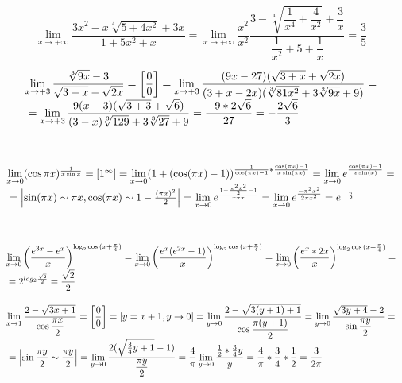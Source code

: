 \documentclass[12pt]{article}
\begin{document}
$$
\begin{array}{l}
\lim\limits_{x\rightarrow+\infty} \dfrac{3x^2-x\sqrt[4]{5+4x^2}+3x}{1+5x^2+x}=\lim\limits_{x\rightarrow+\infty} \dfrac{x^2}{x^2}\dfrac{3-\sqrt[4]{\dfrac{1}{x^4}+\dfrac{4}{x^2}}+\dfrac{3}{x}}{\dfrac{1}{x^2}+5+\dfrac{1}{x}}=\dfrac{3}{5}
\end{array}
$$
 $$
 \begin{array}{l} 
 \lim\limits_{x\rightarrow+3} \dfrac{\sqrt[3]{9x}-3}{\sqrt{3+x}-\sqrt{2x}} = \left[\dfrac{0}{0} \right]= \lim\limits_{x\rightarrow+3} \dfrac{(9x-27)(\sqrt{3+x}+\sqrt{2x})}{(3+x-2x)(\sqrt[3]{81x^2}+3\sqrt[3]{9x}+9)}=\\ \medskip{}{} = \lim\limits_{x\rightarrow+3} \dfrac{9(x-3)(\sqrt{3+3}+\sqrt{6})}{(3-x)\sqrt[3]{129}+3\sqrt[3]{27}+9}=\dfrac{-9*2\sqrt{6}}{27}=-\dfrac{2\sqrt{6}}{3}
 \end{array}
 $$
 \\
$$
\begin{array}{l}
\lim\limits_{x\rightarrow0} (\cos{\pi x})^{\frac{1}{x\sin{x}}}=\left[1^{\infty}\right]=\lim\limits_{x\rightarrow0} (1+(\cos(\pi x)-1))^{\frac{1}{\cos(\pi x)-1}*\frac{\cos(\pi x )-1}{x\sin(\pi x)}}=\lim\limits_{x\rightarrow0} e^{\frac{\cos(\pi x)-1}{x\sin(x)}}=\\ \medskip{}{}= \left|\sin(\pi x)\sim \pi x, \cos(\pi x) \sim 1-\frac{(\pi x)^2}{2} \right|=\lim\limits_{x\rightarrow0} e^{\frac{1-\frac{\pi^2 x^2}{2}-1}{x \pi x}}=\lim\limits_{x\rightarrow0} e^{\frac{- \pi^2 x^2}{2\pi x^2}}=e^{-\frac{\pi}{2}}
\end{array}
$$
\\
$$
\begin{array}{l}
 \lim\limits_{x\rightarrow0} \left(\dfrac{e^{3x}-e^x}{x}\right)^{\log_2 \cos{(x+\frac{\pi}{4})}}= \lim\limits_{x\rightarrow0} \left(\dfrac{e^{x}(e^{2x}-1)}{x}\right)^{\log_2 \cos{(x+\frac{\pi}{4})}}= \lim\limits_{x\rightarrow0} \left(\dfrac{e^x*2x}{x}\right)^{\log_2 \cos{(x+\frac{\pi}{4})}}=\\ \medskip{}{}=2^{log_2 {\frac{\sqrt{2}}{2}}}={\dfrac{\sqrt{2}}{2}}
\end{array}
$$
$$
\begin{array}{l}
\lim\limits_{x\rightarrow1} \dfrac{2-\sqrt{3x+1}}{\cos{\dfrac{\pi x}{2}}}=\left[\dfrac{0}{0} \right]=\left| y=x+1, y \to 0\right|=\lim\limits_{y\rightarrow0} \dfrac{2-\sqrt{3(y+1)+1}}{\cos{\dfrac{\pi (y+1)}{2}}}=\lim\limits_{y\rightarrow0} \dfrac{\sqrt{3y+4}-2}{\sin{\dfrac{\pi y}{2}}}=\\ \medskip{}{}=\left|\sin{\dfrac{\pi y}{2}} \sim \dfrac{\pi y}{2}\right|=\lim\limits_{y\rightarrow0} \dfrac{2(\sqrt{\frac{3}{4}y+1}-1)}{\dfrac{\pi y}{2}}=\dfrac{4}{\pi}\lim\limits_{y\rightarrow0} \dfrac{\frac{1}{2}*\frac{3}{4}y}{y}=\dfrac{4}{\pi}*\dfrac{3}{4}*\dfrac{1}{2}=\dfrac{3}{2 \pi}
\end{array}
$$
\end{document}
